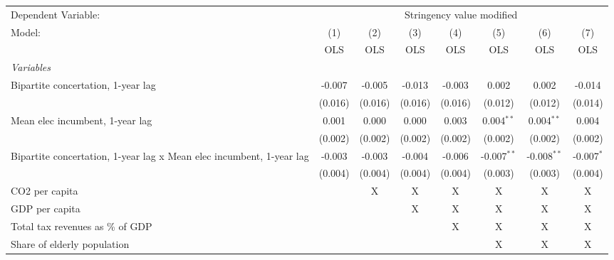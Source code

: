 
\begingroup
\centering
\begin{tabular}{lccccccc}
   \toprule
   Dependent Variable: & \multicolumn{7}{c}{Stringency value modified}\\
   Model:                                                               & (1)     & (2)     & (3)     & (4)     & (5)           & (6)           & (7)\\  
                                                                        &  OLS    & OLS     & OLS     & OLS     & OLS           & OLS           & OLS\\  
   \midrule
   \emph{Variables}\\
   Bipartite concertation, 1-year lag                                   & -0.007  & -0.005  & -0.013  & -0.003  & 0.002         & 0.002         & -0.014\\   
                                                                        & (0.016) & (0.016) & (0.016) & (0.016) & (0.012)       & (0.012)       & (0.014)\\   
   Mean elec incumbent, 1-year lag                                      & 0.001   & 0.000   & 0.000   & 0.003   & 0.004$^{**}$  & 0.004$^{**}$  & 0.004\\   
                                                                        & (0.002) & (0.002) & (0.002) & (0.002) & (0.002)       & (0.002)       & (0.002)\\   
   Bipartite concertation, 1-year lag x Mean elec incumbent, 1-year lag & -0.003  & -0.003  & -0.004  & -0.006  & -0.007$^{**}$ & -0.008$^{**}$ & -0.007$^{*}$\\   
                                                                        & (0.004) & (0.004) & (0.004) & (0.004) & (0.003)       & (0.003)       & (0.004)\\   
   CO2 per capita                                                       &         & X       & X       & X       & X             & X             & X\\  
   GDP per capita                                                       &         &         & X       & X       & X             & X             & X\\  
   Total tax revenues as \% of GDP                                      &         &         &         & X       & X             & X             & X\\  
   Share of elderly population                                          &         &         &         &         & X             & X             & X\\  

\end{tabular}
